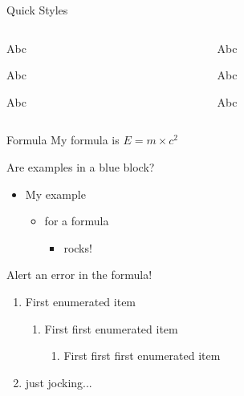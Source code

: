 \documentclass[aspectratio=43]{beamer}
\begin{document}
\begin{frame}{Quick Styles}
\begin{columns}
    \begin{column}{0.12\paperwidth}
    \begin{yellow0block}{Abc}
    \end{yellow0block}
    \begin{yellow1block}{Abc}
    \end{yellow1block}
    \begin{yellow2block}{Abc}
    \end{yellow2block}
    \end{column}

    \begin{column}{0.12\paperwidth}
    \begin{red0block}{Abc}
    \end{red0block}
    \begin{red1block}{Abc}
    \end{red1block}
    \begin{red2block}{Abc}
    \end{red2block}
    \end{column}

\end{columns}
\end{frame}

\begin{frame}{Formula}
    My formula is $E=m\times c^2$
    \begin{blue2block}{Are examples in a blue block?}
    \begin{itemize}
        \item My example
        \begin{itemize}
            \item for a formula
            \begin{itemize}
                \item rocks!
            \end{itemize}
        \end{itemize}
    \end{itemize}
    \end{blue2block}

    \begin{red2block}{Alert an error in the formula!}
    \begin{enumerate}
        \item First enumerated item
        \begin{enumerate}
            \item First first enumerated item
            \begin{enumerate}
                \item First first first enumerated item
            \end{enumerate}
        \end{enumerate}
        \item just jocking...
    \end{enumerate}
    \end{red2block}
\end{frame}

\end{document}
